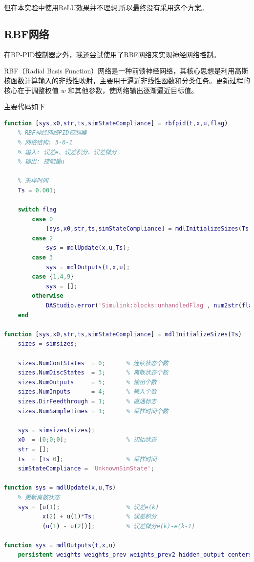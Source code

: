 \documentclass[12pt,a4paper,UTF8]{article}
\begin{document}
但在本实验中使用ReLU效果并不理想,所以最终没有采用这个方案。

\newpage
\subsection{RBF网络}

在BP-PID控制器之外，我还尝试使用了RBF网络来实现神经网络控制。

RBF（Radial Basis Function）网络是一种前馈神经网络，其核心思想是利用高斯核函数计算输入的非线性映射，主要用于逼近非线性函数和分类任务。更新过程的核心在于调整权值 \( w \) 和其他参数，使网络输出逐渐逼近目标值。

主要代码如下

\begin{lstlisting}[language=Matlab,caption=RBF神经网络控制器实现]
    function [sys,x0,str,ts,simStateCompliance] = rbfpid(t,x,u,flag)
    % RBF神经网络PID控制器
    % 网络结构: 3-6-1
    % 输入: 误差e、误差积分、误差微分
    % 输出: 控制量u
    
    % 采样时间
    Ts = 0.001;
    
    switch flag
        case 0
            [sys,x0,str,ts,simStateCompliance] = mdlInitializeSizes(Ts);
        case 2
            sys = mdlUpdate(x,u,Ts);
        case 3
            sys = mdlOutputs(t,x,u);
        case {1,4,9}
            sys = [];
        otherwise
            DAStudio.error('Simulink:blocks:unhandledFlag', num2str(flag));
    end
    
function [sys,x0,str,ts,simStateCompliance] = mdlInitializeSizes(Ts)
    sizes = simsizes;
    
    sizes.NumContStates  = 0;      % 连续状态个数
    sizes.NumDiscStates  = 3;      % 离散状态个数
    sizes.NumOutputs     = 5;      % 输出个数
    sizes.NumInputs      = 4;      % 输入个数
    sizes.DirFeedthrough = 1;      % 直通标志
    sizes.NumSampleTimes = 1;      % 采样时间个数
    
    sys = simsizes(sizes);
    x0  = [0;0;0];                 % 初始状态
    str = [];
    ts  = [Ts 0];                  % 采样时间
    simStateCompliance = 'UnknownSimState';
    
function sys = mdlUpdate(x,u,Ts)
    % 更新离散状态
    sys = [u(1);                   % 误差e(k)
           x(2) + u(1)*Ts;         % 误差积分
           (u(1) - u(2))];         % 误差微分e(k)-e(k-1)
    
function sys = mdlOutputs(t,x,u)
    persistent weights weights_prev weights_prev2 hidden_output centers pid_params
    

\end{lstlisting}
\end{document}
